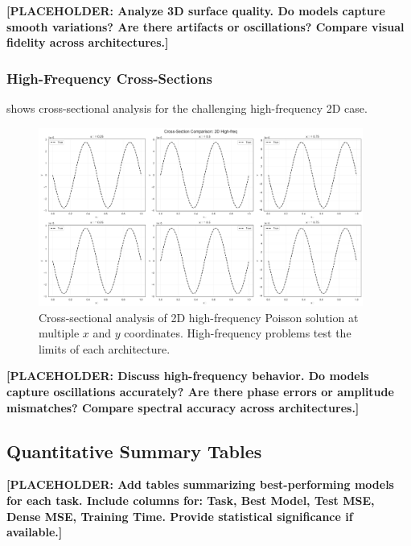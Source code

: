 \documentclass[11pt,a4paper]{article}
\begin{document}
\textbf{[PLACEHOLDER: Analyze 3D surface quality. Do models capture smooth variations? Are there artifacts or oscillations? Compare visual fidelity across architectures.]}

\subsubsection{High-Frequency Cross-Sections}

 shows cross-sectional analysis for the challenging high-frequency 2D case.

\begin{figure}[htbp]
\centering
\includegraphics[width=0.95\textwidth]{../section1/analysis/section1_complete_analysis_20251021_143055/section1_3_analysis/03_heatmap_analysis/cross_section_2_2D High-freq.png}
\caption{Cross-sectional analysis of 2D high-frequency Poisson solution at multiple $x$ and $y$ coordinates. High-frequency problems test the limits of each architecture.}
\label{fig:s13_cross_highfreq}
\end{figure}

\textbf{[PLACEHOLDER: Discuss high-frequency behavior. Do models capture oscillations accurately? Are there phase errors or amplitude mismatches? Compare spectral accuracy across architectures.]}

\subsection{Quantitative Summary Tables}

\textbf{[PLACEHOLDER: Add tables summarizing best-performing models for each task. Include columns for: Task, Best Model, Test MSE, Dense MSE, Training Time. Provide statistical significance if available.]}
\end{document}
